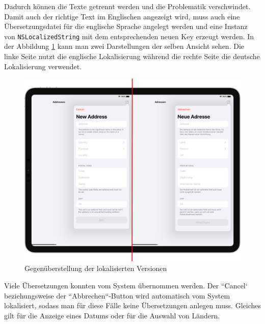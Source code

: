 Dadurch können die Texte getrennt werden und die Problematik verschwindet.
Damit auch der richtige Text im Englischen angezeigt wird, muss auch eine Übersetzungsdatei für die englische Sprache angelegt werden und eine Instanz von \texttt{NSLocalizedString} mit dem entsprechenden neuen Key erzeugt werden.\pbreak%
%
In der Abbildung \ref{fig:localized-results} kann man zwei Darstellungen der selben Ansicht sehen.
Die linke Seite nutzt die englische Lokalisierung während die rechte Seite die deutsche Lokalisierung verwendet.
\begin{figure}[h]
	\centering
	\includegraphics[scale=0.25]{images/localized.png}
	\caption{Gegenüberstellung der lokalisierten Versionen}
	\label{fig:localized-results}
\end{figure}
Viele Übersetzungen konnten vom System übernommen werden.
Der ``Cancel` beziehungsweise der ``Abbrechen``-Button wird automatisch vom System lokalisiert, sodass man für diese Fälle keine Übersetzungen anlegen muss.
Gleiches gilt für die Anzeige eines Datums oder für die Auswahl von Ländern.

